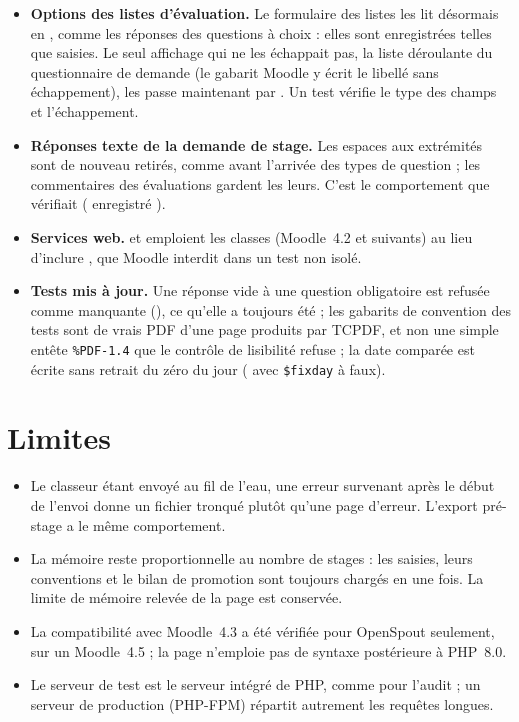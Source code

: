 \documentclass[11pt,a4paper]{article}
\begin{document}
\begin{itemize}
  \item \textbf{Options des listes d'évaluation.} Le formulaire des listes les lit désormais en
    , comme les réponses des questions à choix : elles sont enregistrées telles
    que saisies. Le seul affichage qui ne les échappait pas, la liste déroulante du questionnaire
    de demande (le gabarit Moodle y écrit le libellé sans échappement), les passe maintenant par
    . Un test vérifie le type des champs et l'échappement.
  \item \textbf{Réponses texte de la demande de stage.} Les espaces aux extrémités sont de nouveau
    retirés, comme avant l'arrivée des types de question ; les commentaires des évaluations
    gardent les leurs. C'est le comportement que vérifiait
     ( enregistré ).
  \item \textbf{Services web.}  et  emploient les
    classes  (Moodle~4.2 et suivants) au lieu d'inclure
    , que Moodle interdit dans un test non isolé.
  \item \textbf{Tests mis à jour.} Une réponse vide à une question obligatoire est refusée comme
    manquante (), ce qu'elle a toujours été ; les gabarits de convention
    des tests sont de vrais PDF d'une page produits par TCPDF, et non une simple entête
    \texttt{\%PDF-1.4} que le contrôle de lisibilité refuse ; la date comparée est écrite sans
    retrait du zéro du jour ( avec \texttt{\$fixday} à faux).
\end{itemize}

\section{Limites}

\begin{itemize}
  \item Le classeur étant envoyé au fil de l'eau, une erreur survenant après le début de l'envoi
    donne un fichier tronqué plutôt qu'une page d'erreur. L'export pré-stage a le même
    comportement.
  \item La mémoire reste proportionnelle au nombre de stages : les saisies, leurs conventions et
    le bilan de promotion sont toujours chargés en une fois. La limite de mémoire relevée de la
    page est conservée.
  \item La compatibilité avec Moodle~4.3 a été vérifiée pour OpenSpout seulement, sur un
    Moodle~4.5 ; la page n'emploie pas de syntaxe postérieure à PHP~8.0.
  \item Le serveur de test est le serveur intégré de PHP, comme pour l'audit ; un serveur de
    production (PHP-FPM) répartit autrement les requêtes longues.
\end{itemize}
\end{document}
